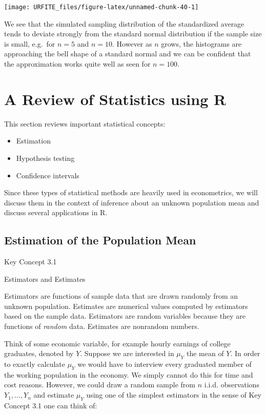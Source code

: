 \documentclass[]{book}
\theoremstyle{definition}
\theoremstyle{definition}
\theoremstyle{definition}
\theoremstyle{remark}
\begin{document}
\begin{center}\texttt{[image: URFITE\_files/figure-latex/unnamed-chunk-40-1]} \end{center}

We see that the simulated sampling distribution of the standardized
average tends to deviate strongly from the standard normal distribution
if the sample size is small, e.g.~for \(n=5\) and \(n=10\). However as
\(n\) grows, the histograms are approaching the bell shape of a standard
normal and we can be confident that the approximation works quite well
as seen for \(n=100\).

\chapter{A Review of Statistics using
R}\label{a-review-of-statistics-using-r}

This section reviews important statistical concepts:

\begin{itemize}
\item
  Estimation
\item
  Hypothesis testing
\item
  Confidence intervals
\end{itemize}

Since these types of statistical methods are heavily used in
econometrics, we will discuss them in the context of inference about an
unknown population mean and discuss several applications in R.

\section{Estimation of the Population
Mean}\label{estimation-of-the-population-mean}

Key Concept 3.1

Estimators and Estimates

Estimators are functions of sample data that are drawn randomly from an
unknown population. Estimates are numerical values computed by
estimators based on the sample data. Estimators are random variables
because they are functions of \emph{random} data. Estimates are
nonrandom numbers.

Think of some economic variable, for example hourly earnings of college
graduates, denoted by \(Y\). Suppose we are interested in \(\mu_Y\) the
mean of \(Y\). In order to exactly calculate \(\mu_Y\) we would have to
interview every graduated member of the working population in the
economy. We simply cannot do this for time and cost reasons. However, we
could draw a random sample from \(n\) i.i.d. observations
\(Y_1, \dots, Y_n\) and estimate \(\mu_Y\) using one of the simplest
estimators in the sense of Key Concept 3.1 one can think of:
\end{document}

